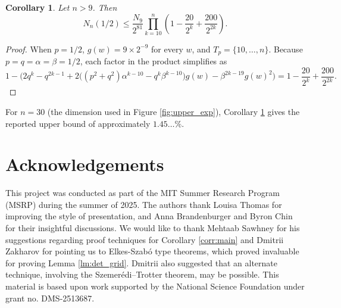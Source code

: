 \documentclass[reqno]{amsart}
\numberwithin{equation}{section}
\newtheorem{corollary}[theorem]{Corollary}
\begin{document}
\begin{corollary}\label{cor:1/2}
Let $n >9$. Then
\[N_n(1/2) \le \frac{N_9}{2^{81}} \prod_{k = 10}^n \left(1 - \frac{20}{2^{k}} +\frac{200}{2^{2k}}\right).\]
\end{corollary}
\begin{proof}
When $p = 1/2$, $g(w) = 9 \times 2^{-9}$ for every $w$, and $T_p = \{10,\ldots,n\}$. Because $p = q = \alpha = \beta = 1/2$, each factor in the product simplifies as
\[1 - \big(2q^k -q^{2k-1} +2 \big((p^2 + q^2) \alpha^{k-10} - q^k \beta^{k-10} \big) g(w) - \beta^{2k-19} g(w)^2\big)=1 - \frac{20}{2^{k}} +\frac{200}{2^{2k}}.\]
\end{proof}

For $n = 30$ (the dimension used in Figure \ref{fig:upper_exp}), Corollary \ref{cor:1/2} gives the reported upper bound of approximately $1.45\ldots \%$.




\section*{Acknowledgements}

This project was conducted as part of the MIT Summer Research Program (MSRP) during the summer of 2025. The authors thank Louisa Thomas for improving the style of presentation, and Anna Brandenburger and Byron Chin for their insightful discussions. We would like to thank Mehtaab Sawhney for his suggestions regarding proof techniques for Corollary \ref{corr:main} and Dmitrii Zakharov for pointing us to Elkes-Szab{\'o} type theorems, which proved invaluable for proving Lemma \ref{lm:det_grid}. Dmitrii also suggested that an alternate technique, involving the Szemerédi–Trotter theorem, may be possible. This material is based upon work supported by the National Science Foundation under grant no. DMS-2513687.

{ \small 
	
	
    
}
\end{document}
